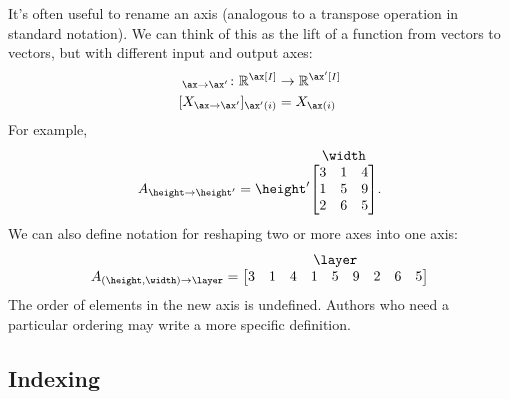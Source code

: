 It's often useful to rename an axis (analogous to a transpose operation in standard notation). We can think of this as the lift of a function from vectors to vectors, but with different input and output axes:
\begin{align*}
[\mathord-]_{\ax\rightarrow\ax'} \colon \reals^{\ax[I]} &\rightarrow \reals^{\ax'[I]} \\
[X_{\ax\rightarrow\ax'}]_{\ax'(i)} &= X_{\ax(i)}
\end{align*}
For example,
\begin{equation*}
A_{\height\rightarrow\height'} = \nmatrix{\height'}{\width}{
  3 & 1 & 4 \\
  1 & 5 & 9 \\
  2 & 6 & 5 \\
}.
\end{equation*}
We can also define notation for reshaping two or more axes into one axis:
\begin{equation*}
  A_{(\height,\width)\rightarrow\layer} = \nmatrix{}{\layer}{
    3 & 1 & 4 & 1 & 5 & 9 & 2 & 6 & 5
  }
\end{equation*}
The order of elements in the new axis is undefined. Authors who need a particular ordering may write a more specific definition.

\subsection{Indexing\protect\footnotemark}


